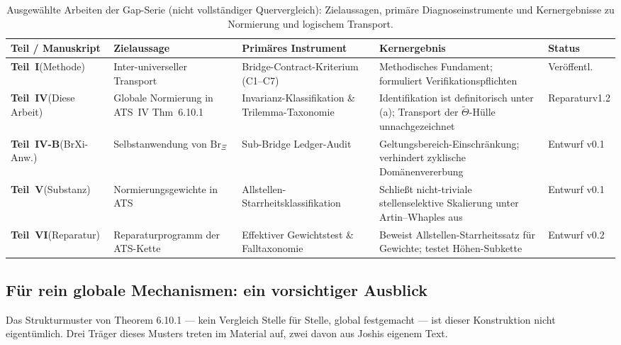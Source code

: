 \documentclass[11pt,a4paper]{article}
\theoremstyle{definition}
\theoremstyle{plain}
\theoremstyle{definition}
\newcommand{\Thet}{\widetilde{\Theta}}
\begin{document}
\begin{table}[htbp]
\centering
\caption{Ausgewählte Arbeiten der Gap-Serie (nicht vollständiger Quervergleich): Zielaussagen, primäre Diagnoseinstrumente und Kernergebnisse zu Normierung und logischem Transport.}
\label{tab:gap_series_crosswalk}
\small
\setlength{\tabcolsep}{3.5pt}
\begin{tabular}{@{}P{0.14\textwidth}P{0.20\textwidth}P{0.22\textwidth}P{0.25\textwidth}P{0.11\textwidth}@{}}
\toprule
Teil / Manuskript & Zielaussage & Primäres Instrument & Kernergebnis & Status \\
\midrule
\textbf{Teil~I}\newline (Methode)
  & Inter-universeller Transport
  & Bridge-Contract-Kriterium (C1--C7)
  & Methodisches Fundament; formuliert Verifikationspflichten
  & Veröffentl. \\[3pt]
\textbf{Teil~IV}\newline (Diese Arbeit)
  & Globale Normierung in ATS~IV Thm~6.10.1
  & Invarianz-Klassifikation \& Trilemma-Taxonomie
  & Identifikation ist definitorisch unter (a); Transport der $\Thet$-Hülle unnachgezeichnet
  & Reparatur\newline v1.2 \\[3pt]
\textbf{Teil~IV-B}\newline (BrXi-Anw.)
  & Selbstanwendung von $\mathrm{Br}_{\Xi}$
  & Sub-Bridge Ledger-Audit
  & Geltungsbereich-Einschränkung; verhindert zyklische Domänenvererbung
  & Entwurf v0.1 \\[3pt]
\textbf{Teil~V}\newline (Substanz)
  & Normierungs\-gewichte in ATS
  & Allstellen-Starrheits\-klassifikation
  & Schließt nicht-triviale stellenselektive Skalierung unter Artin--Whaples aus
  & Entwurf v0.1 \\[3pt]
\textbf{Teil~VI}\newline (Reparatur)
  & Reparatur\-programm der ATS-Kette
  & Effektiver Gewichtstest \& Falltaxonomie
  & Beweist Allstellen-Starrheitssatz für Gewichte; testet Höhen-Subkette
  & Entwurf v0.2 \\
\bottomrule
\end{tabular}
\end{table}

\subsection{Für rein globale Mechanismen: ein vorsichtiger Ausblick}
\label{sec:b2outlook}

Das Strukturmuster von Theorem 6.10.1 --- \glqq kein Vergleich Stelle für Stelle,
global festgemacht\grqq{} --- ist dieser Konstruktion nicht eigentümlich. Drei
Träger dieses Musters treten im Material auf, zwei davon aus Joshis eigenem Text.
\end{document}
